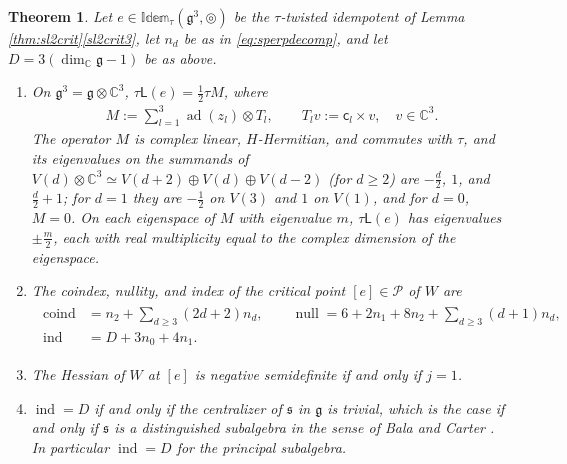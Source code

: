 \documentclass[leqno,10pt]{amsart}
\newtheorem{theorem}{Theorem}[section]
\theoremstyle{definition}
\numberwithin{equation}{section}
\newcommand{\idem}{\mathbb{Idem}}
\newcommand{\tmlt}{\circledcirc}
\newcommand{\lin}{\mathsf{L}}
\newcommand{\g}{\mathfrak{g}}
\newcommand{\ad}{\operatorname{ad}}
\newcommand{\com}{\mathbb C}
\newcommand{\subs}{\mathfrak{s}}
\begin{document}
\begin{theorem}\label{thm:morse}
Let $e \in \idem_{\tau}(\g^{3}, \tmlt)$ be the $\tau$-twisted idempotent of Lemma \ref{thm:sl2crit}\ref{sl2crit3}, let $n_{d}$ be as in \eqref{eq:sperpdecomp}, and let $D = 3(\dim_{\com}\g - 1)$ be as above.
\begin{enumerate}[label=(\arabic*), ref=(\arabic*)]
\item\label{morse1} On $\g^{3} = \g \otimes \com^{3}$, $\tau\lin(e) = \tfrac{1}{2}\tau M$, where
\begin{align}\label{eq:spinorbit}
M := \sum_{l=1}^{3}\ad(z_{l})\otimes T_{l}, \qquad T_{l}v := \mathsf{c}_{l} \times v, \quad v \in \com^{3}.
\end{align}
The operator $M$ is complex linear, $H$-Hermitian, and commutes with $\tau$, and its eigenvalues on the summands of $V(d) \otimes \com^{3} \simeq V(d+2) \oplus V(d) \oplus V(d-2)$ (for $d \geq 2$) are $-\tfrac{d}{2}$, $1$, and $\tfrac{d}{2}+1$; for $d = 1$ they are $-\tfrac{1}{2}$ on $V(3)$ and $1$ on $V(1)$, and for $d = 0$, $M = 0$. On each eigenspace of $M$ with eigenvalue $m$, $\tau\lin(e)$ has eigenvalues $\pm\tfrac{m}{2}$, each with real multiplicity equal to the complex dimension of the eigenspace.
\item\label{morse2} The coindex, nullity, and index of the critical point $[e] \in \mathcal{P}$ of $W$ are
\begin{align}\label{eq:morseindex}
\begin{aligned}
\operatorname{coind} &= n_{2} + \sum_{d \geq 3}(2d+2)n_{d}, \qquad \operatorname{null} = 6 + 2n_{1} + 8n_{2} + \sum_{d \geq 3}(d+1)n_{d},\\
\operatorname{ind} &= D + 3n_{0} + 4n_{1}.
\end{aligned}
\end{align}
\item\label{morse3} The Hessian of $W$ at $[e]$ is negative semidefinite if and only if $j = 1$.
\item\label{morse4} $\operatorname{ind} = D$ if and only if the centralizer of $\subs$ in $\g$ is trivial, which is the case if and only if $\subs$ is a distinguished subalgebra in the sense of Bala and Carter \cite[Section~8.2]{Collingwood-McGovern}. In particular $\operatorname{ind} = D$ for the principal subalgebra.
\end{enumerate}
\end{theorem}
\end{document}
